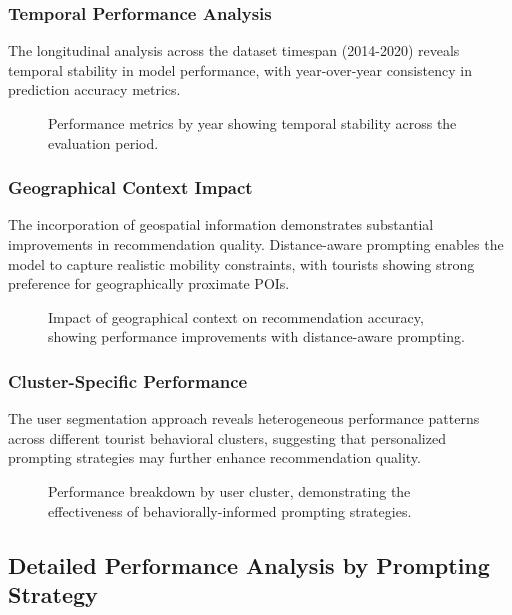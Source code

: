 \documentclass[12pt,a4paper]{article}
\begin{document}
\subsubsection{Temporal Performance Analysis}

The longitudinal analysis across the dataset timespan (2014-2020) reveals temporal stability in model performance, with year-over-year consistency in prediction accuracy metrics.

\begin{figure}[h]
\centering
\caption{Performance metrics by year showing temporal stability across the evaluation period.}
\label{fig:temporal_performance}
\end{figure}

\subsubsection{Geographical Context Impact}

The incorporation of geospatial information demonstrates substantial improvements in recommendation quality. Distance-aware prompting enables the model to capture realistic mobility constraints, with tourists showing strong preference for geographically proximate POIs.

\begin{figure}[h]
\centering
\caption{Impact of geographical context on recommendation accuracy, showing performance improvements with distance-aware prompting.}
\label{fig:geographical_impact}
\end{figure}

\subsubsection{Cluster-Specific Performance}

The user segmentation approach reveals heterogeneous performance patterns across different tourist behavioral clusters, suggesting that personalized prompting strategies may further enhance recommendation quality.

\begin{figure}[h]
\centering
\caption{Performance breakdown by user cluster, demonstrating the effectiveness of behaviorally-informed prompting strategies.}
\label{fig:cluster_performance}
\end{figure}

\subsection{Detailed Performance Analysis by Prompting Strategy}
\end{document}
